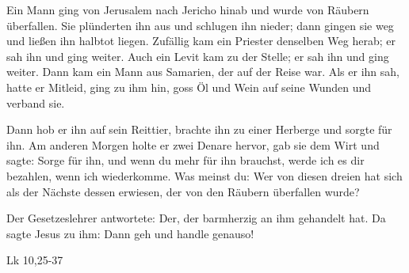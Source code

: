 \begin{savequote}
{\tiny Ein Mann ging von Jerusalem nach Jericho hinab und wurde von
Räubern überfallen. Sie plünderten ihn aus und schlugen ihn nieder; dann gingen sie weg und ließen ihn 
halbtot liegen. Zufällig kam ein Priester denselben Weg
herab; er sah ihn und ging weiter. Auch ein Levit kam zu
der  Stelle; er sah ihn und ging weiter. Dann kam ein Mann
aus  Samarien, der auf der Reise war. Als er ihn sah, hatte
er  Mitleid, ging zu ihm hin, goss Öl und Wein auf seine
Wunden  und verband sie. 

Dann hob er ihn auf sein Reittier,
brachte  ihn zu einer Herberge und sorgte für ihn. Am
anderen Morgen  holte er zwei Denare hervor, gab sie dem
Wirt und sagte:  Sorge für ihn, und wenn du mehr für ihn
brauchst, werde  ich es dir bezahlen, wenn ich wiederkomme.
Was meinst du:  Wer von diesen dreien hat sich als der
Nächste dessen erwiesen,  der von den Räubern überfallen
wurde?  

Der Gesetzeslehrer antwortete: Der, der
barmherzig an  ihm gehandelt hat. Da
sagte Jesus zu ihm: Dann geh und handle genauso!

Lk 10,25-37}
\end{savequote}
% 
% 
% 


% 
% 
% 




